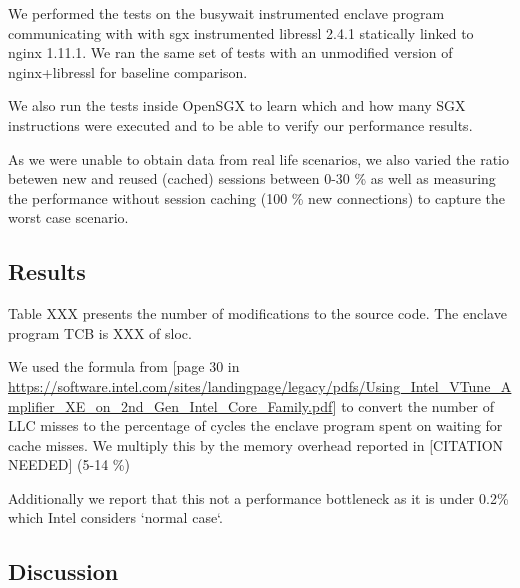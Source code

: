 \documentclass[../main.tex]{subfiles}
\begin{document}
We performed the tests on the busywait instrumented enclave program
communicating with with sgx instrumented libressl 2.4.1 statically linked to
nginx 1.11.1. We ran the same set of tests with an unmodified version of
nginx+libressl for baseline comparison.

We also run the tests inside OpenSGX to learn which and how many SGX
instructions were executed and to be able to verify our performance results.

As we were unable to obtain data from real life scenarios, we also varied the
ratio betewen new and reused (cached) sessions between 0-30 \% as well as
measuring the performance without session caching (100 \% new connections) to
capture the worst case scenario.

\subsection{Results}

Table XXX presents the number of modifications to the source code.
The enclave program TCB is XXX of sloc.

We used the formula from [page 30 in \url{https://software.intel.com/sites/landingpage/legacy/pdfs/Using_Intel_VTune_Amplifier_XE_on_2nd_Gen_Intel_Core_Family.pdf}]
to convert the number of LLC misses to the percentage of cycles the enclave
program spent on waiting for cache misses. We multiply this by the memory
overhead reported in [CITATION NEEDED] (5-14 \%)

Additionally we report that this not a performance bottleneck as it is under
0.2\% which Intel considers `normal case`.




\subsection{Discussion}
\end{document}
